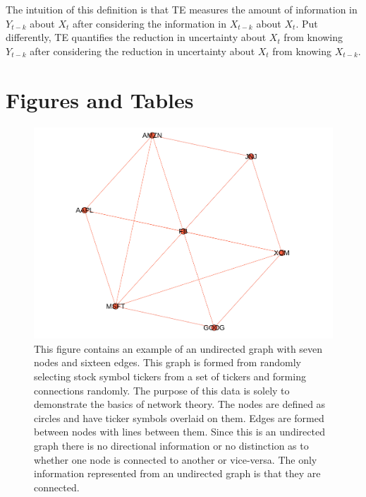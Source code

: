 The intuition of this definition is that TE measures the amount of information in \(Y_{t-k}\) about \(X_t\) after  considering the information in \(X_{t-k}\) about \(X_t\). Put differently, TE quantifies the reduction in uncertainty about \(X_t\) from knowing \(Y_{t-k}\) after considering the reduction in uncertainty about \(X_t\) from knowing \(X_{t-k}\).

\clearpage

\section{Figures and Tables}


\begin{figure}[!htb]
    \centering
      \centering
      \includegraphics[width=\textwidth]{figures/Intro/ExampleNetwork.pdf}

      \caption{
      This figure contains an example of an undirected graph with seven nodes and sixteen edges. This graph is formed from randomly selecting stock symbol tickers from a set of tickers and forming connections randomly. The purpose of this data is solely to demonstrate the basics of network theory. The nodes are defined as circles and have ticker symbols overlaid on them. Edges are formed between nodes with lines between them.  Since this is an undirected graph there is no directional information or no distinction as to whether one node is connected to another or vice-versa.  The only information represented from an undirected graph is that they are connected.  
      }
      \label{fig:IntroExampleNetwork}

  \end{figure}


